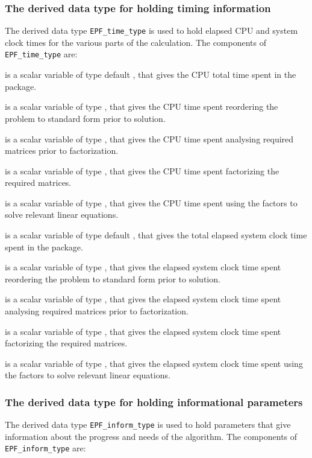 \documentclass{galahad}
\newcommand{\packagename}{EPF}
\begin{document}
\subsubsection{The derived data type for holding timing
 information}\label{typetime}
The derived data type
{\tt \packagename\_time\_type}
is used to hold elapsed CPU and system clock times for the various parts
of the calculation. The components of
{\tt \packagename\_time\_type}
are:
\begin{description}
 is a scalar variable of type default \real, that gives
 the CPU total time spent in the package.

 is a scalar variable of type \realdp, that gives
 the CPU time spent reordering the problem to standard form prior to solution.

 is a scalar variable of type \realdp, that gives
 the CPU time spent analysing required matrices prior to factorization.

 is a scalar variable of type \realdp, that gives
 the CPU time spent factorizing the required matrices.

 is a scalar variable of type \realdp, that gives
 the CPU time spent using the factors to solve relevant linear equations.

 is a scalar variable of type default \real, that gives
 the total elapsed system clock time spent in the package.

 is a scalar variable of type \realdp, that gives
 the elapsed system clock time spent reordering the problem to standard form
prior to solution.

 is a scalar variable of type \realdp, that gives
 the  elapsed system clock time spent analysing required matrices prior to
factorization.

 is a scalar variable of type \realdp, that gives
 the  elapsed system clock time spent factorizing the required matrices.

 is a scalar variable of type \realdp, that gives
 the  elapsed system clock time spent using the factors to solve relevant
linear equations.

\end{description}


\subsubsection{The derived data type for holding informational
 parameters}\label{typeinform}
The derived data type
{\tt \packagename\_inform\_type}
is used to hold parameters that give information about the progress and needs
of the algorithm. The components of
{\tt \packagename\_inform\_type}
are:
\end{document}
